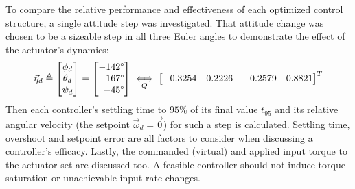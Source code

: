 \par
To compare the relative performance and effectiveness of each optimized control structure, a single attitude step was investigated. That attitude change was chosen to be a sizeable step in all three Euler angles to demonstrate the effect of the actuator's dynamics:
\begin{equation}\label{eq:attitude-step-position}
\vec{\eta}_d\triangleq\begin{bmatrix}
\phi_d\\
\theta_d\\
\psi_d\\
\end{bmatrix}
=
\begin{bmatrix*}[r]
-142\text{\textdegree}\\
167\text{\textdegree}\\
-45\text{\textdegree}
\end{bmatrix*}
\underset{Q}{\iff}
\begin{bmatrix}
-0.3254&
0.2226&
-0.2579&
0.8821
\end{bmatrix}^T
\end{equation}
Then each controller's settling time to $95$\% of its final value $t_{95}$ and its relative angular velocity (the setpoint $\vec{\omega}_d=\vec{0}$) for such a step is calculated. Settling time, overshoot and setpoint error are all factors to consider when discussing a controller's efficacy. Lastly, the commanded (virtual) and applied input torque to the actuator set are discussed too. A feasible controller should not induce torque saturation or unachievable input rate changes.
